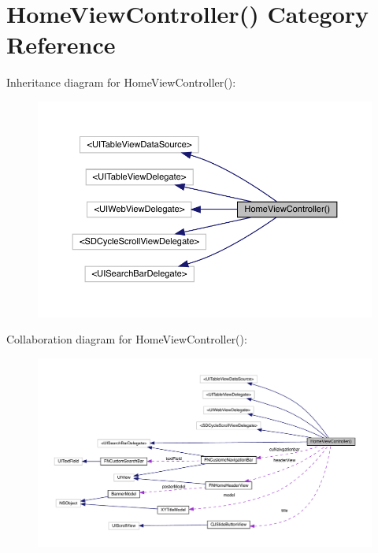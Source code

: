 \hypertarget{category_home_view_controller_07_08}{}\section{Home\+View\+Controller() Category Reference}
\label{category_home_view_controller_07_08}


Inheritance diagram for Home\+View\+Controller()\+:\nopagebreak
\begin{figure}[H]
\begin{center}
\leavevmode
\includegraphics[width=350pt]{category_home_view_controller_07_08__inherit__graph}
\end{center}
\end{figure}


Collaboration diagram for Home\+View\+Controller()\+:\nopagebreak
\begin{figure}[H]
\begin{center}
\leavevmode
\includegraphics[width=350pt]{category_home_view_controller_07_08__coll__graph}
\end{center}
\end{figure}
